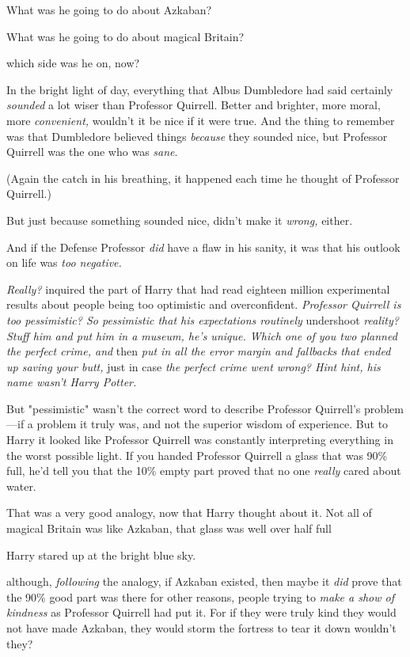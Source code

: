 What was he going to do about Azkaban?

What was he going to do about magical Britain?

{\el} which side was he on, now?

In the bright light of day, everything that Albus Dumbledore had said certainly
\emph{sounded} a lot wiser than Professor Quirrell. Better and brighter, more
moral, more \emph{convenient,} wouldn't it be nice if it were true. And the
thing to remember was that Dumbledore believed things \emph{because} they
sounded nice, but Professor Quirrell was the one who was \emph{sane}.

(Again the catch in his breathing, it happened each time he thought of
Professor Quirrell.)

But just because something sounded nice, didn't make it \emph{wrong,} either.

And if the Defense Professor \emph{did} have a flaw in his sanity, it was that
his outlook on life was \emph{too negative.}

\emph{Really?} inquired the part of Harry that had read eighteen million
experimental results about people being too optimistic and overconfident.
\emph{Professor Quirrell is too pessimistic? So pessimistic that his
expectations routinely} undershoot \emph{reality? Stuff him and put him in a
museum, he's unique. Which one of you two planned the perfect crime, and}
then \emph{put in all the error margin and fallbacks that ended up saving your
butt,} just in case \emph{the perfect crime went wrong? Hint hint, his name
wasn't Harry Potter.}

But "pessimistic" wasn't the correct word to describe Professor Quirrell's
problem---if a problem it truly was, and not the superior wisdom of experience.
But to Harry it looked like Professor Quirrell was constantly interpreting
everything in the worst possible light. If you handed Professor Quirrell a
glass that was 90\% full, he'd tell you that the 10\% empty part proved that no
one \emph{really} cared about water.

That was a very good analogy, now that Harry thought about it. Not all of
magical Britain was like Azkaban, that glass was well over half full{\el}

Harry stared up at the bright blue sky.

{\el} although, \emph{following} the analogy, if Azkaban existed, then maybe
it \emph{did} prove that the 90\% good part was there for other reasons, people
trying to \emph{make a show of kindness} as Professor Quirrell had put it. For
if they were truly kind they would not have made Azkaban, they would storm the
fortress to tear it down{\el} wouldn't they?

